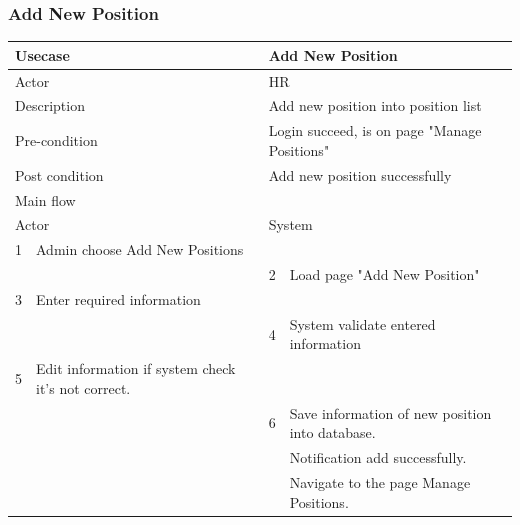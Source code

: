 \documentclass[a4paper]{article}
\begin{document}
\subsubsection{Add New Position}
\begin{tabular}{|l|p{5cm}||l|p{5cm}|}
	\hline 
	\multicolumn{2}{|p{5cm}|}{Usecase} & \multicolumn{2}{|p{5cm}|}{Add New Position}\\ 
	\hline 
	\multicolumn{2}{|p{5cm}|}{Actor} & \multicolumn{2}{|p{5cm}|}{HR} \\ 
	\hline 
	\multicolumn{2}{|p{5cm}|}{Description} & \multicolumn{2}{|p{5cm}|}{Add new position into position list}\\
	\hline
	\multicolumn{2}{|p{5cm}|}{Pre-condition} & \multicolumn{2}{|p{5cm}|}{Login succeed, is on page "Manage Positions"}\\
	\hline
	\multicolumn{2}{|p{5cm}|}{Post condition} & \multicolumn{2}{|p{5cm}|}{Add new position successfully} \\
	\hline
	\multicolumn{4}{|l|}{Main flow} \\
	\hline
	\multicolumn{2}{|p{5cm}|}{Actor} & \multicolumn{2}{|p{5cm}|}{System} \\
	\hline
	1 & Admin choose Add New Positions & & \\
	\hline
	& & 2 & Load page "Add New Position" \\
	\hline 
	3 & Enter required information & & \\	
	\hline
	& & 4 &System validate entered information \\	
	\hline 
	5 & Edit information if system check it's not correct. & & \\	
	\hline
	& & 6 &Save information of new position into database.\\
	& &  &Notification add successfully.\\
	& & &Navigate to the page Manage Positions. \\	
	\hline 	
\end{tabular}
\end{document}
